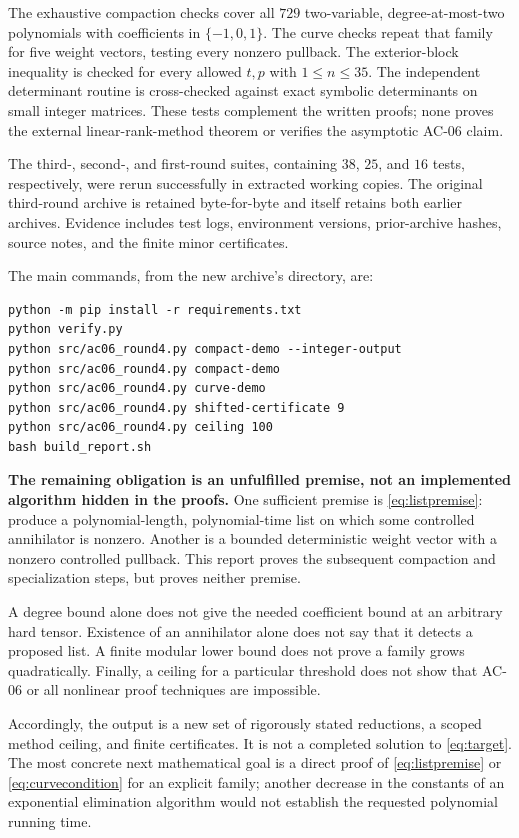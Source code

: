 \documentclass[11pt]{article}
\theoremstyle{definition}
\theoremstyle{remark}
\begin{document}
The exhaustive compaction checks cover all $729$ two-variable, degree-at-most-two polynomials with coefficients in $\{-1,0,1\}$. The curve checks repeat that family for five weight vectors, testing every nonzero pullback. The exterior-block inequality is checked for every allowed $t,p$ with $1\le n\le35$. The independent determinant routine is cross-checked against exact symbolic determinants on small integer matrices. These tests complement the written proofs; none proves the external linear-rank-method theorem or verifies the asymptotic AC-06 claim.

The third-, second-, and first-round suites, containing $38$, $25$, and $16$ tests, respectively, were rerun successfully in extracted working copies. The original third-round archive is retained byte-for-byte and itself retains both earlier archives. Evidence includes test logs, environment versions, prior-archive hashes, source notes, and the finite minor certificates.

The main commands, from the new archive's directory, are:
\begin{verbatim}
python -m pip install -r requirements.txt
python verify.py
python src/ac06_round4.py compact-demo --integer-output
python src/ac06_round4.py compact-demo
python src/ac06_round4.py curve-demo
python src/ac06_round4.py shifted-certificate 9
python src/ac06_round4.py ceiling 100
bash build_report.sh
\end{verbatim}

\textbf{The remaining obligation is an unfulfilled premise, not an implemented algorithm hidden in the proofs.} One sufficient premise is \eqref{eq:listpremise}: produce a polynomial-length, polynomial-time list on which some controlled annihilator is nonzero. Another is a bounded deterministic weight vector with a nonzero controlled pullback. This report proves the subsequent compaction and specialization steps, but proves neither premise.

A degree bound alone does not give the needed coefficient bound at an arbitrary hard tensor. Existence of an annihilator alone does not say that it detects a proposed list. A finite modular lower bound does not prove a family grows quadratically. Finally, a ceiling for a particular threshold does not show that AC-06 or all nonlinear proof techniques are impossible.

Accordingly, the output is a new set of rigorously stated reductions, a scoped method ceiling, and finite certificates. It is not a completed solution to \eqref{eq:target}. The most concrete next mathematical goal is a direct proof of \eqref{eq:listpremise} or \eqref{eq:curvecondition} for an explicit family; another decrease in the constants of an exponential elimination algorithm would not establish the requested polynomial running time.
\end{document}
